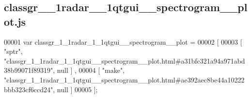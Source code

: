 \subsection{classgr\+\_\+\_\+1radar\+\_\+\_\+1qtgui\+\_\+\+\_\+spectrogram\+\_\+\+\_\+plot.\+js}
\label{classgr__1__1radar__1__1qtgui____spectrogram____plot_8js_source}

\begin{DoxyCode}
00001 var classgr_1_1radar_1_1qtgui__spectrogram__plot =
00002 [
00003     [ \textcolor{stringliteral}{"sptr"}, \textcolor{stringliteral}{"classgr\_1\_1radar\_1\_1qtgui\_\_spectrogram\_\_plot.html#a31bfc321a94a971abd38b99071f89319"}, null ]
      ,
00004     [ \textcolor{stringliteral}{"make"}, \textcolor{stringliteral}{"classgr\_1\_1radar\_1\_1qtgui\_\_spectrogram\_\_plot.html#ae392aec8be44a10222bbb323cf6ccd24"}, null ]
00005 ];
\end{DoxyCode}
